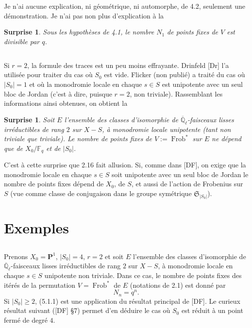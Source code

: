 \documentclass[11pt,a4paper]{article}
\theoremstyle{plain}
\newtheorem{surprise}[theorem]{Surprise}
\theoremstyle{definition}
\DeclareMathOperator{\Frob}{Frob}
\newcommand{\F}{\mathbb{F}}
\newcommand{\Ql}{\overline{\mathbb{Q}}_\ell}
\begin{document}
Je n'ai aucune explication, ni g\'eom\'etrique, ni automorphe, de 4.2, seulement une d\'emonstration. Je n'ai pas non plus d'explication \`a la

\begin{surprise}
Sous les hypoth\`eses de 4.1, le nombre $N_1$ de points fixes de $V$ est divisible par $q$.
\end{surprise}

\subsection{}
Si $r = 2$, la formule des traces est un peu moins effrayante. Drinfeld [Dr] l'a utilis\'ee pour traiter du cas o\`u $S_0$ est vide. Flicker (non publi\'e) a trait\'e du cas o\`u $|S_0| = 1$ et o\`u la monodromie locale en chaque $s \in S$ est unipotente avec un seul bloc de Jordan (c'est \`a dire, puisque $r = 2$, non triviale). Rassemblant les informations ainsi obtenues, on obtient la

\begin{surprise}
Soit $E$ l'ensemble des classes d'isomorphie de $\Ql$-faisceaux lisses irr\'eductibles de rang $2$ sur $X - S$, \`a monodromie locale unipotente (tant non triviale que triviale). Le nombre de points fixes de $V := \Frob^*$ sur $E$ ne d\'epend que de $X_0/\F_q$ et de $|S_0|$.
\end{surprise}

C'est \`a cette surprise que 2.16 fait allusion. Si, comme dans [DF], on exige que la monodromie locale en chaque $s \in S$ soit unipotente avec un seul bloc de Jordan le nombre de points fixes d\'epend de $X_0$, de $S$, et aussi de l'action de Frobenius sur $S$ (vue comme classe de conjugaison dans le groupe sym\'etrique $\mathfrak{S}_{|S_0|}$).

\section{Exemples}

\subsection{}
Prenons $X_0 = \mathbf{P}^1$, $|S_0| = 4$, $r = 2$ et soit $E$ l'ensemble des classes d'isomorphie de $\Ql$-faisceaux lisses irr\'eductibles de rang $2$ sur $X - S$, \`a monodromie locale en chaque $s \in S$ unipotente non triviale. Dans ce cas, le nombre de points fixes des it\'er\'es de la permutation $V = \Frob^*$ de $E$ (notations de 2.1) est donn\'e par
\begin{equation}
N_n = q^n.
\tag{5.1.1}
\end{equation}
Si $|S_0| \geq 2$, (5.1.1) est une application du r\'esultat principal de [DF]. Le curieux r\'esultat suivant ([DF] \S 7) permet d'en d\'eduire le cas o\`u $S_0$ est r\'eduit \`a un point ferm\'e de degr\'e $4$.
\end{document}

